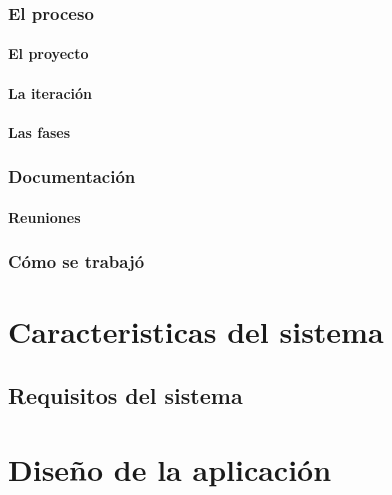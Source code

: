 \documentclass{iccmemoria}
\begin{document}
		\subsection{El proceso}
			\subsubsection{El proyecto}
			\subsubsection{La iteración}
			\subsubsection{Las fases}
		\subsection{Documentación}
			\subsubsection{Reuniones}
		\subsection{Cómo se trabajó}
	
\chapter{Caracteristicas del sistema}
	\section{Requisitos del sistema}
	

\chapter{Diseño de la aplicación}





	












%
\end{document}
